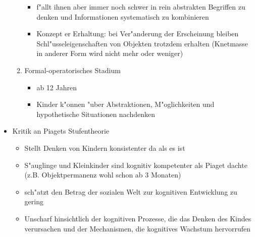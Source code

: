 \begin{itemize}
\begin{enumerate}
\begin{itemize}
					\item
						f"allt ihnen aber immer noch schwer in rein abstrakten Begriffen zu denken und Informationen systematisch zu kombinieren
					\item
						Konzept er Erhaltung: bei Ver"anderung der Erscheinung bleiben Schl"usseleigenschaften von Objekten trotzdem erhalten (Knetmasse in anderer Form wird nicht mehr oder weniger)
				\end{itemize}
			\item
				Formal-operatorisches Stadium
				\begin{itemize}
					\item
						ab 12 Jahren
					\item
						Kinder k"onnen "uber Abstraktionen, M"oglichkeiten und hypothetische Situationen nachdenken
				\end{itemize}
		\end{enumerate}
	\item
		Kritik an Piagets Stufentheorie
		\begin{itemize}
			\item
				Stellt Denken von Kindern konsistenter da als es ist
			\item
				S"auglinge und Kleinkinder sind kognitiv kompetenter als Piaget dachte (z.B. Objektpermanenz wohl schon ab 3 Monaten)
			\item
				sch"atzt den Betrag der sozialen Welt zur kognitiven Entwicklung zu gering
			\item
				Unscharf hinsichtlich der kognitiven Prozesse, die das Denken des Kindes verursachen und der Mechanismen, die kognitives Wachstum hervorrufen
		\end{itemize}
\end{itemize}


